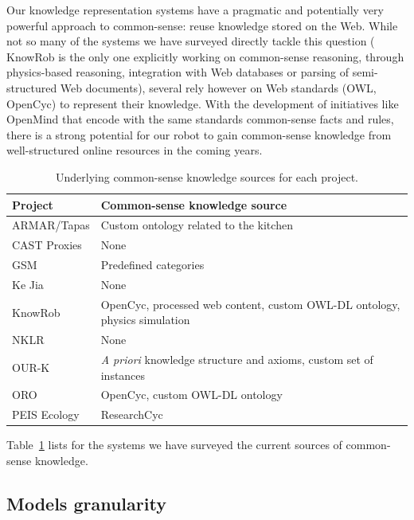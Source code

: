 Our knowledge representation systems have a pragmatic and potentially very
powerful approach to common-sense: reuse knowledge stored on the Web. While not
so many of the systems we have surveyed directly tackle this question ({\sc
KnowRob} is the only one explicitly working on common-sense reasoning, through
physics-based reasoning, integration with Web databases or parsing of
semi-structured Web documents), several rely however on Web standards (OWL,
OpenCyc) to represent their knowledge. With the development of initiatives like
OpenMind that encode with the same standards common-sense facts and rules,
there is a strong potential for our robot to gain common-sense knowledge from
well-structured online resources in the coming years.

\begin{table}
\begin{center}

\begin{tabular}{ll}
\toprule
{\bf Project} & {\bf Common-sense knowledge source} \\
\midrule
ARMAR/{\sc Tapas} & Custom ontology related to the kitchen\\
CAST Proxies &  None \\
GSM &  Predefined categories \\
Ke Jia & None \\
{\sc KnowRob} & {\sc OpenCyc}, processed web content, custom OWL-DL ontology, physics simulation \\
NKLR &  None \\
OUR-K & {\it A priori} knowledge structure and axioms, custom set of instances\\
ORO & {\sc OpenCyc}, custom OWL-DL ontology \\
PEIS Ecology & {\sc ResearchCyc} \\

\bottomrule

\end{tabular}
\end{center}
\caption{Underlying common-sense knowledge sources for each project.}
\label{table|knowledge-sources}
\end{table}

Table~\ref{table|knowledge-sources} lists for the systems we have surveyed the
current sources of common-sense knowledge.

\subsection{Models granularity}

